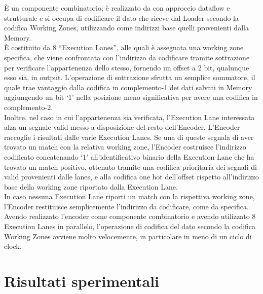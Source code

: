 \documentclass[10pt,english, openany]{book}
\begin{document}
È un componente combinatorio; è realizzato da con approccio dataflow e strutturale e si occupa di codificare il dato che riceve dal Loader secondo la codifica Working Zones, utilizzando come indirizzi base quelli provenienti dalla Memory.\\
È costituito da 8 “Execution Lanes”, alle quali è assegnata una working zone specifica, che viene confrontata con l'indirizzo da codificare tramite sottrazione per verificare l'appartenenza dello stesso, fornendo un offset a 2 bit, qualunque esso sia, in output. L’operazione di sottrazione sfrutta un semplice sommatore, il quale trae vantaggio dalla codifica in complemento-1 dei dati salvati in Memory aggiungendo un bit ‘1’ nella posizione meno significativa per avere una codifica in complemento-2.\\
Inoltre, nel caso in cui l’appartenenza sia verificata, l’Execution Lane interessata alza un segnale valid messo a disposizione del resto dell’Encoder.
L’Encoder raccoglie i risultati dalle varie Execution Lanes. Se una di queste segnala di aver trovato un match con la relativa working zone, l’Encoder costruisce l’indirizzo codificato concatenando ‘1’ all’identificativo binario della Execution Lane che ha trovato un match positivo, ottenuto tramite una codifica prioritaria dei segnali di valid provenienti dalle lanes, e alla codifica one hot dell’offset rispetto all'indirizzo base della working zone riportato dalla Execution Lane.\\
In caso nessuna Execution Lane riporti un match con la rispettiva working zone, l’Encoder restituisce semplicemente l’indirizzo da codificare, come da specifica.\\
Avendo realizzato l’encoder come componente combinatorio e avendo utilizzato 8 Execution Lanes in parallelo, l’operazione di codifica del dato secondo la codifica Working Zones avviene molto velocemente, in particolare in meno di un ciclo di clock.

\chapter{Risultati sperimentali}
\end{document}
